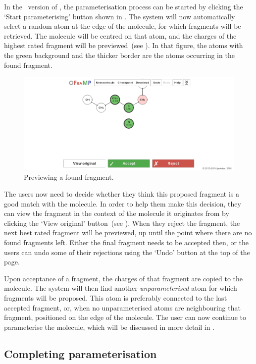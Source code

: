 In the \IDb\ version of \oframp, the parameterisation process can be started by clicking the `Start parameterising' button shown in . The system will now automatically select a random atom at the edge of the molecule, for which fragments will be retrieved. The molecule will be centred on that atom, and the charges of the highest rated fragment will be previewed~(see ). In that figure, the atoms with the green background and the thicker border are the atoms occurring in the found fragment.

\begin{figure}
\center
\includegraphics[width=.9\textwidth]{img/find_4.png}
\caption{Previewing a found fragment.}
\end{figure}

The users now need to decide whether they think this proposed fragment is a good match with the molecule. In order to help them make this decision, they can view the fragment in the context of the molecule it originates from by clicking the `View original' button~(see ). When they reject the fragment, the next best rated fragment will be previewed, up until the point where there are no found fragments left. Either the final fragment needs to be accepted then, or the users can undo some of their rejections using the `Undo' button at the top of the page.

Upon acceptance of a fragment, the charges of that fragment are copied to the molecule. The system will then find another \emph{unparameterised} atom for which fragments will be proposed. This atom is preferably connected to the last accepted fragment, or, when no unparameterised atoms are neighbouring that fragment, positioned on the edge of the molecule. The user can now continue to parameterise the molecule, which will be discussed in more detail in .


\subsection{Completing parameterisation}


